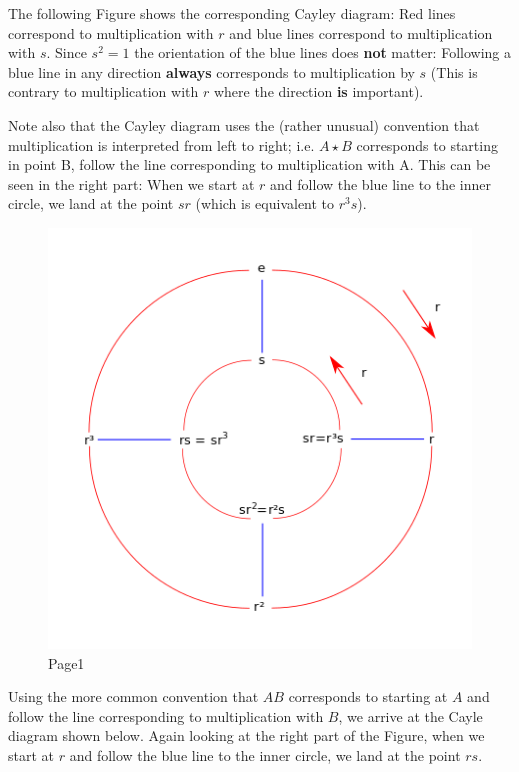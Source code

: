 The following Figure shows the corresponding Cayley diagram: Red lines
correspond to multiplication with \(r\) and blue lines correspond to
multiplication with \(s\). Since \(s^2 = 1\) the orientation of the blue
lines does \textbf{not} matter: Following a blue line in any direction
\textbf{always} corresponds to multiplication by \(s\) (This is contrary
to multiplication with \(r\) where the direction \textbf{is} important).

Note also that the Cayley diagram uses the (rather unusual) convention
that multiplication is interpreted from left to right; i.e.
\(A \star B\) corresponds to starting in point B, follow the line
corresponding to multiplication with A. This can be seen in the right
part: When we start at \(r\) and follow the blue line to the inner
circle, we land at the point \(sr\) (which is equivalent to \(r^3s\)).

\begin{figure}[H]
\centering
\includegraphics[scale=0.7]{images/groups_04_4.png}
\caption{Page1}
\end{figure}

Using the more common convention that \(AB\) corresponds to starting at
\(A\) and follow the line corresponding to multiplication with \(B\), we
arrive at the Cayle diagram shown below. Again looking at the right part
of the Figure, when we start at \(r\) and follow the blue line to the
inner circle, we land at the point \(rs\).

